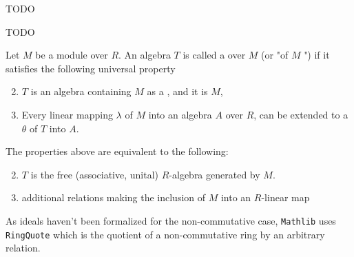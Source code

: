 \begin{definition}[RingQuot]
    \label{RingQuot}

    TODO

\end{definition}

\begin{definition}
    \label{TensorAlgebra_Rel}

    TODO

\end{definition}

\begin{definition}
    \label{TensorAlgebra}

    Let $M$ be a module over $R$. An algebra $T$ is called a  over $M$ (or "of $M$ ")
    if it satisfies the following universal property

    \begin{enumerate}
    \setcounter{enumi}{1}
    \item $T$ is an algebra containing $M$ as a , and it is  $M$,
    \item Every linear mapping $\lambda$ of $M$ into an algebra $A$ over $R$, can be extended to 
    a  $\theta$ of $T$ into $A$.
    \end{enumerate}

\end{definition}

\begin{remark}
    \label{mk:TensorAlgebra}

    The properties above are equivalent to the following:

    \begin{enumerate}
        \setcounter{enumi}{1}
        \item $T$ is the free (associative, unital) $R$-algebra generated by $M$.
        \item additional relations making the inclusion of $M$ into an $R$-linear map
    \end{enumerate}

    As ideals haven't been formalized for the non-commutative case, \texttt{Mathlib} uses \texttt{RingQuote} which is
    the quotient of a non-commutative ring by an arbitrary relation.
    
\end{remark}